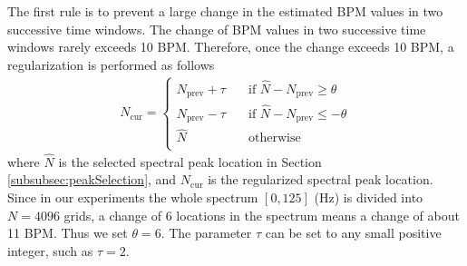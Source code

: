 \documentclass[10pt,twocolumn]{IEEEtran}
\begin{document}
The first  rule is to prevent a large change in the estimated BPM values in two successive time windows. The change of BPM values in two successive time windows rarely exceeds 10 BPM. Therefore, once the change exceeds 10 BPM, a regularization is performed as follows
\begin{eqnarray}
N_{\mathrm{cur}} =
\left\{
\begin{array}{ll}
N_{\mathrm{prev}} + \tau  & \quad \textrm{if $\widehat{N} - N_{\mathrm{prev}} \geq \theta$}   \\
N_{\mathrm{prev}} - \tau  & \quad \textrm{if $\widehat{N} - N_{\mathrm{prev}} \leq - \theta$}   \\
\widehat{N}  & \quad \textrm{otherwise}   \\
\end{array} \right.
\end{eqnarray}
where $\widehat{N}$ is the selected spectral peak location in Section \ref{subsubsec:peakSelection}, and $N_{\mathrm{cur}}$ is the regularized spectral peak location. Since in our experiments the whole spectrum $[0, 125]$ (Hz) is divided into $N=4096$ grids, a change of 6 locations in the spectrum means a change of about 11 BPM. Thus we set $\theta = 6$. The parameter $\tau$ can be set to any small positive integer, such as $\tau = 2$.
\end{document}
